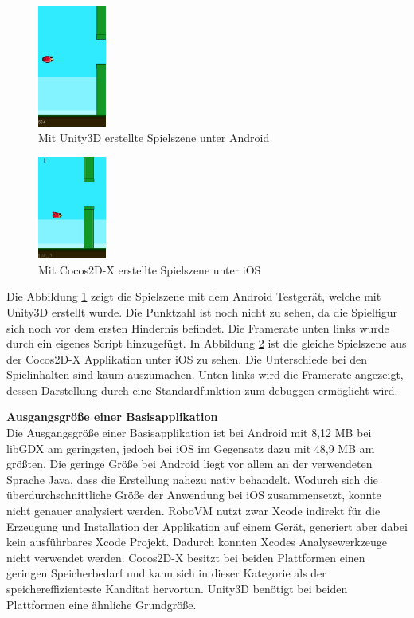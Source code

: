 \begin{figure}[htbp]
	\centering
	\includegraphics[width=0.2\textwidth]{bilder/Unity_Android}
	\caption{Mit Unity3D erstellte Spielszene unter Android}\label{game_unity}
\end{figure}

\begin{figure}[htbp]
	\centering
	\includegraphics[width=0.2\textwidth]{bilder/Cocos_iOS}
	\caption{Mit Cocos2D-X erstellte Spielszene unter iOS}\label{game_cocos}
\end{figure}

Die Abbildung \ref{game_unity} zeigt die Spielszene mit dem Android Testgerät, welche mit Unity3D erstellt wurde. Die Punktzahl ist noch nicht zu sehen, da die Spielfigur sich noch vor dem ersten Hindernis befindet. Die Framerate unten links wurde durch ein eigenes Script hinzugefügt. 
In Abbildung \ref{game_cocos} ist die gleiche Spielszene aus der Cocos2D-X Applikation unter iOS zu sehen. Die Unterschiede bei den Spielinhalten sind kaum auszumachen. Unten links wird die Framerate angezeigt, dessen Darstellung durch eine Standardfunktion zum debuggen ermöglicht wird.

\bigskip
\textbf{Ausgangsgröße einer Basisapplikation} \\
Die Ausgangsgröße einer Basisapplikation ist bei Android mit 8,12 MB bei libGDX am geringsten, jedoch bei iOS im Gegensatz dazu mit 48,9 MB am größten. Die geringe Größe bei Android liegt vor allem an der verwendeten Sprache Java, dass die Erstellung nahezu nativ behandelt. Wodurch sich die überdurchschnittliche Größe der Anwendung bei iOS zusammensetzt, konnte nicht genauer analysiert werden. RoboVM nutzt zwar Xcode indirekt für die Erzeugung und Installation der Applikation auf einem Gerät, generiert aber dabei kein ausführbares Xcode Projekt. Dadurch konnten Xcodes Analysewerkzeuge nicht verwendet werden.
Cocos2D-X besitzt bei beiden Plattformen einen geringen Speicherbedarf und kann sich in dieser Kategorie als der speichereffizienteste Kanditat hervortun.
Unity3D benötigt bei beiden Plattformen eine ähnliche Grundgröße.

